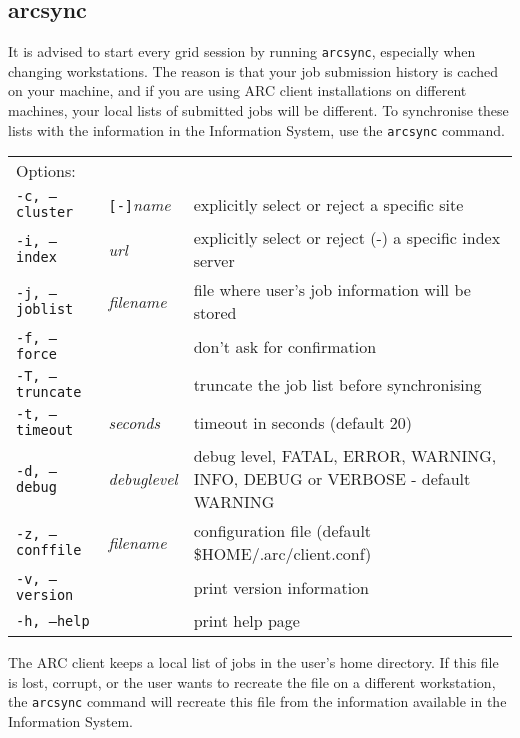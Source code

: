 \subsection{arcsync}
\label{sec:arcsync}

It is advised to start every grid session by running \texttt{arcsync},
especially when changing workstations. The reason is that your job submission
history is cached on your machine, and if you are using ARC client
installations on different machines, your local lists of submitted jobs will be different. To synchronise
these lists with the information in the Information System, use the
\texttt{arcsync}  command.

\hspace*{0.5cm}
\begin{shaded}
\end{shaded}
\begin{longtable}{llp{8cm}}
   Options:&&\\
   \texttt{-c, --cluster}&\verb#[-]#\textit{name}&explicitly select or reject a specific site\\
   \texttt{-i, --index}&\textit{url}&explicitly select or reject (-) a specific index server\\
   \texttt{-j, --joblist}&\textit{filename}&file where user's job information will be stored\\
   \texttt{-f, --force}& &don't ask for confirmation\\
   \texttt{-T, --truncate}& &truncate the job list before synchronising\\
   \texttt{-t, --timeout}&\textit{seconds}&timeout in seconds (default 20)\\
   \texttt{-d, --debug}&\textit{debuglevel}&debug level, FATAL, ERROR, WARNING, INFO, DEBUG or VERBOSE - default WARNING\\
   \texttt{-z, --conffile}&\textit{filename}& configuration file (default {\$}HOME/.arc/client.conf)\\
   \texttt{-v, --version}&&print version information\\
   \texttt{-h, --help}&&print help page\\
\end{longtable}

The ARC client keeps a local list of jobs in the user's home
directory. If this file is lost,
corrupt, or the user wants to recreate the file on a different
workstation, the \texttt{arcsync} command will recreate this file from
the information available in the Information System.

